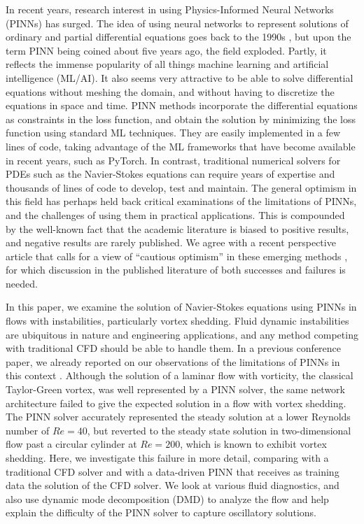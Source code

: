 
In recent years, research interest in using Physics-Informed Neural Networks (PINNs) has surged.
The idea of using neural networks to represent solutions of ordinary and partial differential equations goes back to the 1990s \cite{dissanayake_neural-network-based_1994,lagaris_artificial_1998}, but upon the term PINN being coined about five years ago, the field exploded. 
Partly, it reflects the immense popularity of all things machine learning and artificial intelligence (ML/AI). 
It also seems very attractive to be able to solve differential equations without meshing the domain, and without having to discretize the equations in space and time. 
PINN methods incorporate the differential equations as constraints in the loss function, and obtain the solution by minimizing the loss function using standard ML techniques.
They are easily implemented in a few lines of code, taking advantage of the ML frameworks that have become available in recent years, such as PyTorch. 
In contrast, traditional numerical solvers for PDEs such as the Navier-Stokes equations can require years of expertise and thousands of lines of code to develop, test and maintain. 
The general optimism in this field has perhaps held back critical examinations of the limitations of PINNs, and the challenges of using them in practical applications. 
This is compounded by the well-known fact that the academic literature is biased to positive results, and negative results are rarely published. 
We agree with a recent perspective article that calls for a view of ``cautious optimism'' in these emerging methods \cite{vinuesa_emerging_2022}, for which discussion in the published literature of both successes and failures is needed.

In this paper, we examine the solution of Navier-Stokes equations using PINNs in flows with instabilities, particularly vortex shedding. 
Fluid dynamic instabilities are ubiquitous in nature and engineering applications, and any method competing with traditional CFD should be able to handle them. 
In a previous conference paper, we already reported on our observations of the limitations of PINNs in this context \cite{chuang_experience_2022}. 
Although the solution of a laminar flow with vorticity, the classical Taylor-Green vortex, was well represented by a PINN solver, the same network architecture failed to give the expected solution in a flow with vortex shedding. 
The PINN solver accurately represented the steady solution at a lower Reynolds number of $Re=40$, but reverted to the steady state solution in two-dimensional flow past a circular cylinder at $Re=200$, which is known to exhibit vortex shedding. 
Here, we investigate this failure in more detail, comparing with a traditional CFD solver and with a data-driven PINN that receives as training data the solution of the CFD solver. 
We look at various fluid diagnostics, and also use dynamic mode decomposition (DMD) to analyze the flow and help explain the difficulty of the PINN solver to capture oscillatory solutions.

